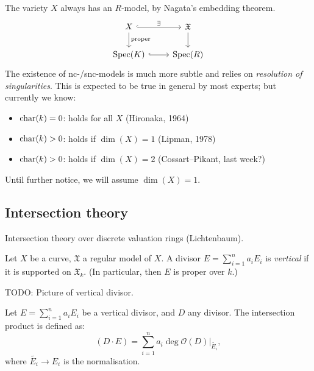 The variety $X$ always has an $R$-model, by Nagata's embedding theorem.
\[
	\begin{tikzcd}
		X \dar{\text{proper}} \rar[hook]{\exists} & \mathfrak{X} \dar \\
		\Spec(K) \rar[hook] & \Spec(R)
	\end{tikzcd}
\]
The existence of nc-/snc-models is much more subtle and relies on
\emph{resolution of singularities}. This is expected to be true in general by
most experts; but currently we know:
\begin{itemize}
	\item $\mathrm{char}(k) = 0$: holds for all $X$ (Hironaka, 1964)
	\item $\mathrm{char}(k) > 0$: holds if $\dim(X) = 1$ (Lipman, 1978)
	\item $\mathrm{char}(k) > 0$: holds if $\dim(X) = 2$ (Cossart--Pikant, last week?)
\end{itemize}
Until further notice, we will assume $\dim(X) = 1$.

\subsection{Intersection theory}

Intersection theory over discrete valuation rings (Lichtenbaum).

Let $X$ be a curve, $\mathfrak{X}$ a regular model of $X$. A divisor $E =
\sum_{i=1}^{n} a_{i}E_{i}$ is \emph{vertical} if it is supported on
$\mathfrak{X}_{k}$. (In particular, then $E$ is proper over $k$.)

TODO: Picture of vertical divisor.

Let $E = \sum_{i=1}^{n} a_{i}E_{i}$ be a vertical divisor, and $D$ any divisor.
The intersection product is defined as:
\[
	(D \cdot E) = \sum_{i=1}^{n} a_{i} \deg \mathcal{O}(D)|_{\tilde{E_{i}}},
\]
where $\tilde{E_{i}} \to E_{i}$ is the normalisation.

